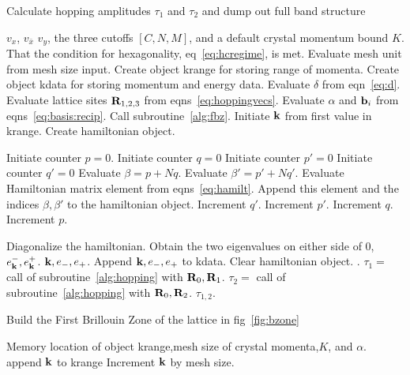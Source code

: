 \documentclass[a4paper,10pt]{article}
\begin{document}
\begin{algorithm}                      %
\caption{Calculate hopping amplitudes $\tau_1$ and $\tau_2$ and dump out full band structure}          %
\label{alg:main}                           %
\begin{algorithmic}                    %
\REQUIRE $v_x$, $v_{\bar{x}}$ $v_y$, the three cutoffs $[C,N,M]$, and a default crystal momentum bound $K$.
\ENSURE That the condition for hexagonality, eq~\ref{eq:hcregime}, is met.
\STATE Evaluate mesh unit from mesh size input.
\STATE Create object krange for storing range of momenta.
\STATE Create object kdata for storing momentum and energy data. 
\STATE Evaluate $\delta$ from eqn~\ref{eq:d}.
\STATE Evaluate lattice sites ${\bf R}_{1,2,3}$ from eqns~\ref{eq:hoppingvecs}.
\STATE Evaluate $\alpha$ and ${\bf b}_i$ from eqns~\ref{eq:basis:recip}.
\STATE
\STATE {} 
\STATE Call subroutine~\ref{alg:fbz}.
\STATE 
\STATE Initiate ${\bf k}$ from first value in krange.
\STATE Create hamiltonian object.

\STATE Initiate counter $p=0$.
\STATE Initiate counter $q=0$
\STATE Initiate counter $p'=0$
\STATE Initiate counter $q'=0$
\STATE Evaluate $\beta = p + Nq$.
\STATE Evaluate $\beta'  = p' +Nq'$.
\STATE Evaluate Hamiltonian matrix element from eqns~\ref{eq:hamilt}.
\STATE Append this element and the indices $\beta,\beta'$ to the hamiltonian object.
\STATE Increment $q'$.
\ENDWHILE
\STATE Increment $p'$.
\ENDWHILE
\STATE Increment $q$.
\ENDWHILE
\STATE Increment $p$.
\ENDWHILE

\STATE Diagonalize the hamiltonian.
\STATE Obtain the two eigenvalues on either side of $0$,  $e^-_{\bf k},e^+_{\bf k}$.
\PRINT ${\bf k},e_-,e_+$.
\STATE Append ${\bf k},e_-,e_+$ to kdata.
\STATE Clear hamiltonian object.
\ENDFOR
\STATE
\STATE {}.
\STATE $\tau_1=$ call of subroutine~\ref{alg:hopping} with ${\bf R}_0, {\bf R}_1$.
\STATE $\tau_2=$ call of subroutine~\ref{alg:hopping} with ${\bf R}_0, {\bf R}_2$.
\PRINT $\tau_{1,2}$.
\end{algorithmic}
\end{algorithm}
\begin{algorithm}
\caption{Build the First Brillouin Zone of the lattice in fig~\ref{fig:bzone}}
\label{alg:fbz}                           %
\begin{algorithmic}                    %
\REQUIRE Memory location of object krange,mesh size of crystal momenta,$K$, and $\alpha$.
\STATE append ${\bf k}$ to krange
\ENDIF
\STATE Increment ${\bf k}$ by mesh size.
\ENDFOR
\end{algorithmic}
\end{algorithm}
\end{document}
